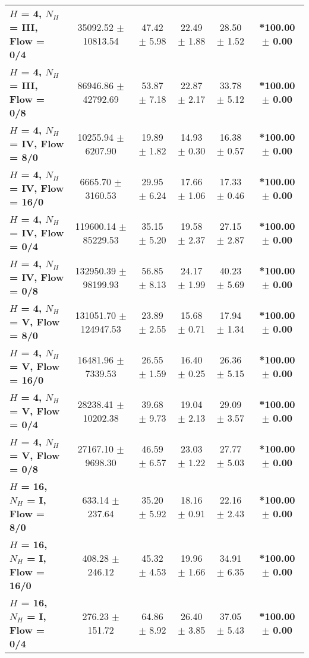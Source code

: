 \begin{table*}[ht]
{\begin{tabular}{lccccc}
        \textbf{$H$ = 4, $N_H$ = III, Flow = 0/4} & 35092.52 $\pm$ 10813.54 & 47.42 $\pm$ 5.98 & 22.49 $\pm$ 1.88 & 28.50 $\pm$ 1.52 & \textbf{*100.00 $\pm$ 0.00} \\
        \textbf{$H$ = 4, $N_H$ = III, Flow = 0/8} & 86946.86 $\pm$ 42792.69 & 53.87 $\pm$ 7.18 & 22.87 $\pm$ 2.17 & 33.78 $\pm$ 5.12 & \textbf{*100.00 $\pm$ 0.00} \\
        \midrule
        \textbf{$H$ = 4, $N_H$ = IV, Flow = 8/0} & 10255.94 $\pm$ 6207.90 & 19.89 $\pm$ 1.82 & 14.93 $\pm$ 0.30 & 16.38 $\pm$ 0.57 & \textbf{*100.00 $\pm$ 0.00} \\
        \textbf{$H$ = 4, $N_H$ = IV, Flow = 16/0} & 6665.70 $\pm$ 3160.53 & 29.95 $\pm$ 6.24 & 17.66 $\pm$ 1.06 & 17.33 $\pm$ 0.46 & \textbf{*100.00 $\pm$ 0.00} \\
        \textbf{$H$ = 4, $N_H$ = IV, Flow = 0/4} & 119600.14 $\pm$ 85229.53 & 35.15 $\pm$ 5.20 & 19.58 $\pm$ 2.37 & 27.15 $\pm$ 2.87 & \textbf{*100.00 $\pm$ 0.00} \\
        \textbf{$H$ = 4, $N_H$ = IV, Flow = 0/8} & 132950.39 $\pm$ 98199.93 & 56.85 $\pm$ 8.13 & 24.17 $\pm$ 1.99 & 40.23 $\pm$ 5.69 & \textbf{*100.00 $\pm$ 0.00} \\
        \midrule
        \textbf{$H$ = 4, $N_H$ = V, Flow = 8/0} & 131051.70 $\pm$ 124947.53 & 23.89 $\pm$ 2.55 & 15.68 $\pm$ 0.71 & 17.94 $\pm$ 1.34 & \textbf{*100.00 $\pm$ 0.00} \\
        \textbf{$H$ = 4, $N_H$ = V, Flow = 16/0} & 16481.96 $\pm$ 7339.53 & 26.55 $\pm$ 1.59 & 16.40 $\pm$ 0.25 & 26.36 $\pm$ 5.15 & \textbf{*100.00 $\pm$ 0.00} \\
        \textbf{$H$ = 4, $N_H$ = V, Flow = 0/4} & 28238.41 $\pm$ 10202.38 & 39.68 $\pm$ 9.73 & 19.04 $\pm$ 2.13 & 29.09 $\pm$ 3.57 & \textbf{*100.00 $\pm$ 0.00} \\
        \textbf{$H$ = 4, $N_H$ = V, Flow = 0/8} & 27167.10 $\pm$ 9698.30 & 46.59 $\pm$ 6.57 & 23.03 $\pm$ 1.22 & 27.77 $\pm$ 5.03 & \textbf{*100.00 $\pm$ 0.00} \\
        \midrule
        \midrule
        \textbf{$H$ = 16, $N_H$ = I, Flow = 8/0} & 633.14 $\pm$ 237.64 & 35.20 $\pm$ 5.92 & 18.16 $\pm$ 0.91 & 22.16 $\pm$ 2.43 & \textbf{*100.00 $\pm$ 0.00} \\
        \textbf{$H$ = 16, $N_H$ = I, Flow = 16/0} & 408.28 $\pm$ 246.12 & 45.32 $\pm$ 4.53 & 19.96 $\pm$ 1.66 & 34.91 $\pm$ 6.35 & \textbf{*100.00 $\pm$ 0.00} \\
        \textbf{$H$ = 16, $N_H$ = I, Flow = 0/4} & 276.23 $\pm$ 151.72 & 64.86 $\pm$ 8.92 & 26.40 $\pm$ 3.85 & 37.05 $\pm$ 5.43 & \textbf{*100.00 $\pm$ 0.00} \\

\end{tabular}}
\end{table*}
